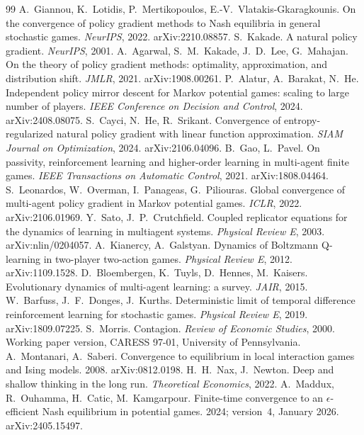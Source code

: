 \documentclass[11pt,a4paper]{article}
\theoremstyle{definition}
\theoremstyle{plain}
\begin{document}
\begin{thebibliography}{99}
 A.~Giannou, K.~Lotidis, P.~Mertikopoulos, E.-V.~Vlatakis-Gkaragkounis. On the convergence of policy gradient methods to Nash equilibria in general stochastic games. \emph{NeurIPS}, 2022. arXiv:2210.08857.
 S.~Kakade. A natural policy gradient. \emph{NeurIPS}, 2001.
 A.~Agarwal, S.~M.~Kakade, J.~D.~Lee, G.~Mahajan. On the theory of policy gradient methods: optimality, approximation, and distribution shift. \emph{JMLR}, 2021. arXiv:1908.00261.
 P.~Alatur, A.~Barakat, N.~He. Independent policy mirror descent for Markov potential games: scaling to large number of players. \emph{IEEE Conference on Decision and Control}, 2024. arXiv:2408.08075.
 S.~Cayci, N.~He, R.~Srikant. Convergence of entropy-regularized natural policy gradient with linear function approximation. \emph{SIAM Journal on Optimization}, 2024. arXiv:2106.04096.
 B.~Gao, L.~Pavel. On passivity, reinforcement learning and higher-order learning in multi-agent finite games. \emph{IEEE Transactions on Automatic Control}, 2021. arXiv:1808.04464.
 S.~Leonardos, W.~Overman, I.~Panageas, G.~Piliouras. Global convergence of multi-agent policy gradient in Markov potential games. \emph{ICLR}, 2022. arXiv:2106.01969.
 Y.~Sato, J.~P.~Crutchfield. Coupled replicator equations for the dynamics of learning in multiagent systems. \emph{Physical Review E}, 2003. arXiv:nlin/0204057.
 A.~Kianercy, A.~Galstyan. Dynamics of Boltzmann Q-learning in two-player two-action games. \emph{Physical Review E}, 2012. arXiv:1109.1528.
 D.~Bloembergen, K.~Tuyls, D.~Hennes, M.~Kaisers. Evolutionary dynamics of multi-agent learning: a survey. \emph{JAIR}, 2015.
 W.~Barfuss, J.~F.~Donges, J.~Kurths. Deterministic limit of temporal difference reinforcement learning for stochastic games. \emph{Physical Review E}, 2019. arXiv:1809.07225.
 S.~Morris. Contagion. \emph{Review of Economic Studies}, 2000. Working paper version, CARESS 97-01, University of Pennsylvania.
 A.~Montanari, A.~Saberi. Convergence to equilibrium in local interaction games and Ising models. 2008. arXiv:0812.0198.
 H.~H.~Nax, J.~Newton. Deep and shallow thinking in the long run. \emph{Theoretical Economics}, 2022.
 A.~Maddux, R.~Ouhamma, H.~Catic, M.~Kamgarpour. Finite-time convergence to an $\epsilon$-efficient Nash equilibrium in potential games. 2024; version~4, January 2026. arXiv:2405.15497.

\end{thebibliography}
\end{document}
